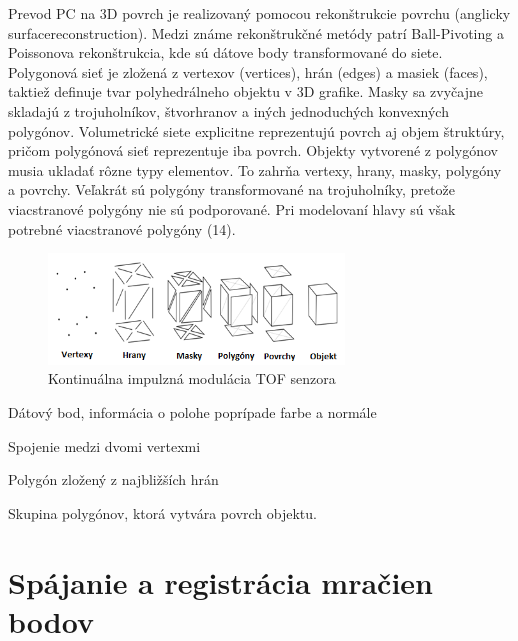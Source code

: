 Prevod PC na 3D povrch je realizovaný pomocou rekonštrukcie povrchu (anglicky surfacereconstruction). Medzi známe rekonštrukčné metódy patrí Ball-Pivoting a  Poissonova rekonštrukcia, kde sú dátove body transformované do siete. Polygonová sieť je zložená z vertexov (vertices), hrán (edges) a masiek (faces), taktiež definuje tvar polyhedrálneho objektu v 3D grafike. Masky sa zvyčajne skladajú z trojuholníkov, štvorhranov a iných jednoduchých konvexných polygónov. Volumetrické siete explicitne reprezentujú povrch aj objem štruktúry, pričom polygónová sieť reprezentuje iba povrch. Objekty vytvorené z polygónov musia ukladať rôzne typy elementov. To zahrňa vertexy, hrany, masky, polygóny a povrchy. Veľakrát sú polygóny transformované na trojuholníky, pretože viacstranové polygóny nie sú podporované. Pri modelovaní hlavy sú však potrebné viacstranové polygóny (14).

\begin{figure}[h]

	\centering

	\includegraphics[width=0.7\textwidth]{figures/vertex_edge_polygon.png} 

	\caption{Kontinuálna impulzná modulácia TOF senzora}
	\label{fig:vertex_edge_polygon}

\end{figure}

\begin{description}[leftmargin=*,labelsep=5.8mm, font=$\bullet$~\normalfont\scshape\color{black!20!black}]
	\item[Vertex] Dátový bod, informácia o polohe poprípade farbe a normále 
	\item[Hrana] Spojenie medzi dvomi vertexmi 
	\item[Maska] Polygón zložený z najbližších hrán
	\item[Povrch] Skupina polygónov, ktorá vytvára povrch objektu.
\end{description}


\section{Spájanie a registrácia mračien bodov}


